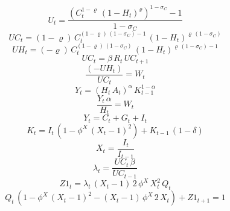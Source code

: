\begin{dmath}
{U}_{t}=\frac{\left({C}_{t}^{1-{{\varrho}}}\, \left(1-{H}_{t}\right)^{{{\varrho}}}\right)^{1-{{\sigma_{C}}}}-1}{1-{{\sigma_{C}}}}
\end{dmath}
\begin{dmath}
{UC}_{t}=\left(1-{{\varrho}}\right)\, {C}_{t}^{\left(1-{{\varrho}}\right)\, \left(1-{{\sigma_{C}}}\right)-1}\, \left(1-{H}_{t}\right)^{{{\varrho}}\, \left(1-{{\sigma_{C}}}\right)}
\end{dmath}
\begin{dmath}
{UH}_{t}=\left(-{{\varrho}}\right)\, {C}_{t}^{\left(1-{{\varrho}}\right)\, \left(1-{{\sigma_{C}}}\right)}\, \left(1-{H}_{t}\right)^{{{\varrho}}\, \left(1-{{\sigma_{C}}}\right)-1}
\end{dmath}
\begin{dmath}
{UC}_{t}={{\beta}}\, {R}_{t}\, {UC}_{t+1}
\end{dmath}
\begin{dmath}
\frac{\left(-{UH}_{t}\right)}{{UC}_{t}}={W}_{t}
\end{dmath}
\begin{dmath}
{Y}_{t}=\left({H}_{t}\, {A}_{t}\right)^{{{\alpha}}}\, {K}_{t-1}^{1-{{\alpha}}}
\end{dmath}
\begin{dmath}
\frac{{Y}_{t}\, {{\alpha}}}{{H}_{t}}={W}_{t}
\end{dmath}
\begin{dmath}
{Y}_{t}={C}_{t}+{G}_{t}+{I}_{t}
\end{dmath}
\begin{dmath}
{K}_{t}={I}_{t}\, \left(1-{{\phi^X}}\, \left({X}_{t}-1\right)^{2}\right)+{K}_{t-1}\, \left(1-{{\delta}}\right)
\end{dmath}
\begin{dmath}
{X}_{t}=\frac{{I}_{t}}{{I}_{t-1}}
\end{dmath}
\begin{dmath}
{\lambda}_{t}=\frac{{UC}_{t}\, {{\beta}}}{{UC}_{t-1}}
\end{dmath}
\begin{dmath}
{Z1}_{t}={\lambda}_{t}\, \left({X}_{t}-1\right)\, 2\, {{\phi^X}}\, {X}_{t}^{2}\, {Q}_{t}
\end{dmath}
\begin{dmath}
{Q}_{t}\, \left(1-{{\phi^X}}\, \left({X}_{t}-1\right)^{2}-\left({X}_{t}-1\right)\, {{\phi^X}}\, 2\, {X}_{t}\right)+{Z1}_{t+1}=1
\end{dmath}
